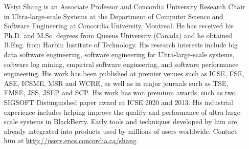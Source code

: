 \documentclass[10pt,journal,compsoc]{IEEEtran}
\begin{document}
{\begin{IEEEbiography}
{Weiyi Shang}
is an Associate Professor and Concordia University Research Chair in Ultra-large-scale Systems at the Department of Computer Science and Software Engineering at Concordia University, Montreal. He has received his Ph.D. and M.Sc. degrees from Queens University (Canada) and he obtained B.Eng. from Harbin Institute of Technology. His research interests include big data software engineering, software engineering for Ultra-large-scale systems, software log mining, empirical software engineering, and software performance engineering. His work has been published at premier venues such as ICSE, FSE, ASE, ICSME, MSR and WCRE, as well as in major journals such as TSE, EMSE, JSS, JSEP and SCP. His work has won premium awards, such as two SIGSOFT Distinguished paper award at ICSE 2020 and 2013. His industrial experience includes helping improve the quality and performance of ultra-large-scale systems in BlackBerry. Early tools and techniques developed by him are already integrated into products used by millions of users worldwide. Contact him at \url{http://users.encs.concordia.ca/shang}.
\end{IEEEbiography}

}
\end{document}
